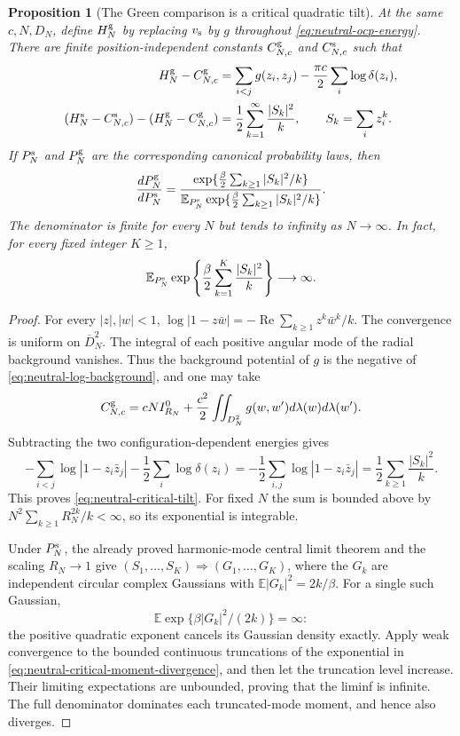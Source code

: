 \documentclass[11pt,a4paper]{article}
\numberwithin{equation}{section}
\newtheorem{proposition}[theorem]{Proposition}
\theoremstyle{definition}
\theoremstyle{remark}
\begin{document}
\begin{proposition}[The Green comparison is a critical quadratic tilt]
\label{prop:neutral-critical-mode-tilt}
At the same $c,N,D_N$, define $H_N^{\rm g}$ by replacing
$v_{\rm s}$ by $g$ throughout \eqref{eq:neutral-ocp-energy}.
There are finite position-independent constants $C_{N,c}^{\rm g}$ and
$C_{N,c}^{\rm s}$ such that
\begin{align*}
 H_N^{\rm g}-C_{N,c}^{\rm g}
 &=\sum_{i<j}g(z_i,z_j)-\frac{\pi c}{2}\sum_i\log\delta(z_i),\\
 (H_N^{\rm s}-C_{N,c}^{\rm s})
 -(H_N^{\rm g}-C_{N,c}^{\rm g})
 &=\frac12\sum_{k=1}^{\infty}\frac{|S_k|^2}{k},
 \qquad S_k=\sum_i z_i^k.
\end{align*}
If $P_N^{\rm s}$ and $P_N^{\rm g}$ are the corresponding canonical
probability laws, then
\begin{equation}
 \frac{dP_N^{\rm g}}{dP_N^{\rm s}}
 =\frac{\exp\{\frac\beta2\sum_{k\ge1}|S_k|^2/k\}}
 {\mathbb E_{P_N^{\rm s}}
       \exp\{\frac\beta2\sum_{k\ge1}|S_k|^2/k\}}.
 \label{eq:neutral-critical-tilt}
\end{equation}
The denominator is finite for every $N$ but tends to infinity as
$N\to\infty$.  In fact, for every fixed integer $K\ge1$,
\begin{equation}
 \mathbb E_{P_N^{\rm s}}
   \exp\left\{\frac\beta2\sum_{k=1}^{K}\frac{|S_k|^2}{k}\right\}
 \longrightarrow\infty.
 \label{eq:neutral-critical-moment-divergence}
\end{equation}
\end{proposition}

\begin{proof}
For every $|z|,|w|<1$,
$\log|1-z\bar w|=-\operatorname{Re}\sum_{k\ge1}z^k\bar w^k/k$.
The convergence is uniform on $\overline D_N^2$.
The integral of each positive angular mode of the radial background
vanishes.  Thus the background potential of $g$ is the negative of
\eqref{eq:neutral-log-background}, and one may take
\[
 C_{N,c}^{\rm g}
 =cNI_{R_N}^0
 +\frac{c^2}{2}\iint_{D_N^2}g(w,w')d\lambda(w)d\lambda(w').
\]
Subtracting the two configuration-dependent energies gives
\[
 -\sum_{i<j}\log|1-z_i\bar z_j|
 -\frac12\sum_i\log\delta(z_i)
 =-\frac12\sum_{i,j}\log|1-z_i\bar z_j|
 =\frac12\sum_{k\ge1}\frac{|S_k|^2}{k}.
\]
This proves \eqref{eq:neutral-critical-tilt}.
For fixed $N$ the sum is bounded above by
$N^2\sum_{k\ge1}R_N^{2k}/k<\infty$, so its exponential is integrable.

Under $P_N^{\rm s}$, the already proved harmonic-mode central limit
theorem and the scaling $R_N\to1$ give
$(S_1,\ldots,S_K)\Rightarrow(G_1,\ldots,G_K)$, where the $G_k$
are independent circular complex Gaussians with
$\mathbb E|G_k|^2=2k/\beta$.
For a single such Gaussian,
\[
 \mathbb E\exp\{\beta|G_k|^2/(2k)\}=\infty:
\]
the positive quadratic exponent cancels its Gaussian density exactly.
Apply weak convergence to the bounded continuous truncations of the
exponential in \eqref{eq:neutral-critical-moment-divergence}, and then
let the truncation level increase.  Their limiting expectations are
unbounded, proving that the liminf is infinite.  The full denominator
dominates each truncated-mode moment, and hence also diverges.
\end{proof}
\end{document}
